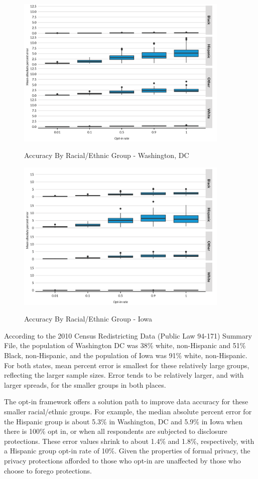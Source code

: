 \documentclass[
]{urban-formatting}
\begin{document}
\begin{figure}[!htb]
    \centering
    \caption{Accuracy By Racial/Ethnic Group - Washington, DC}
    \includegraphics[width=4in]{../analysis/figures/dec-race-accuracy-dc.png}
    \label{fig:dec-race-accuracy-dc}
\end{figure}

\begin{figure}[!htb]
    \centering
    \caption{Accuracy By Racial/Ethnic Group - Iowa}
    \includegraphics[width=4in]{../analysis/figures/dec-race-accuracy-ia.png}
    \label{fig:dec-race-accuracy-ia}
\end{figure}

According to the 2010 Census Redistricting Data (Public Law 94-171)
Summary File, the population of Washington DC was 38\% white,
non-Hispanic and 51\% Black, non-Hispanic, and the population of Iowa
was 91\% white, non-Hispanic. For both states, mean percent error is
smallest for these relatively large groups, reflecting the larger sample
sizes. Error tends to be relatively larger, and with larger spreads, for
the smaller groups in both places.

The opt-in framework offers a solution path to improve data accuracy for
these smaller racial/ethnic groups. For example, the median absolute
percent error for the Hispanic group is about 5.3\% in Washington, DC
and 5.9\% in Iowa when there is 100\% opt in, or when all respondents
are subjected to disclosure protections. These error values shrink to
about 1.4\% and 1.8\%, respectively, with a Hispanic group opt-in rate
of 10\%. Given the properties of formal privacy, the privacy protections
afforded to those who opt-in are unaffected by those who choose to
forego protections.
\end{document}
